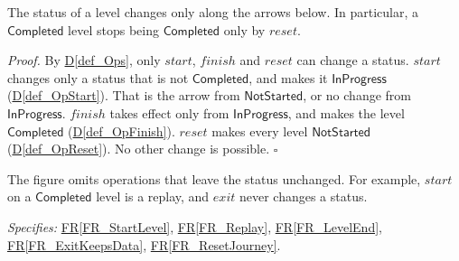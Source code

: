 \documentclass[12pt]{article}
\newcommand{\rref}[1]{\hyperref[#1]{FR\ref*{#1}}}
\newcounter{thmnum} %
\newenvironment{theorem}[2]{%
  \refstepcounter{thmnum}\label{#2}%
  \tcolorbox[formalbox, colback=teal!7, colframe=teal!80!black,
    title={Theorem T\thethmnum: #1}]%
}{\endtcolorbox}
\newcommand{\defref}[1]{\hyperref[#1]{D\ref*{#1}}}
\newcommand{\val}[1]{\ensuremath{\mathsf{#1}}}
\begin{document}
\begin{theorem}{Level status state machine}{thm_StatusMachine}
The status of a level changes only along the arrows below. In particular, a
\val{Completed} level stops being \val{Completed} only by $\mathit{reset}$.

\begin{center}
\end{center}
\end{theorem}
\textit{Proof.} By \defref{def_Ops}, only $\mathit{start}$, $\mathit{finish}$
and $\mathit{reset}$ can change a status. $\mathit{start}$ changes only a
status that is not \val{Completed}, and makes it \val{InProgress}
(\defref{def_OpStart}). That is the arrow from \val{NotStarted}, or no change
from \val{InProgress}. $\mathit{finish}$ takes effect only from
\val{InProgress}, and makes the level \val{Completed} (\defref{def_OpFinish}).
$\mathit{reset}$ makes every level \val{NotStarted} (\defref{def_OpReset}). No
other change is possible. \hfill $\square$

The figure omits operations that leave the status unchanged. For example,
$\mathit{start}$ on a \val{Completed} level is a replay, and $\mathit{exit}$
never changes a status.

\textit{Specifies:} \rref{FR_StartLevel}, \rref{FR_Replay},
\rref{FR_LevelEnd}, \rref{FR_ExitKeepsData}, \rref{FR_ResetJourney}.
\end{document}
